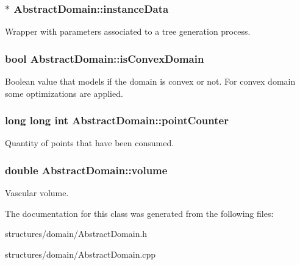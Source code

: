 \subsubsection[{\texorpdfstring{instance\+Data}{instanceData}}]{$\ast$ Abstract\+Domain\+::instance\+Data\hspace{0.3cm}{\ttfamily [protected]}}\hypertarget{class_abstract_domain_aa37fbabc2bfa92c574f7db7544016b53}{}\label{class_abstract_domain_aa37fbabc2bfa92c574f7db7544016b53}
Wrapper with parameters associated to a tree generation process. 
\subsubsection[{\texorpdfstring{is\+Convex\+Domain}{isConvexDomain}}]{\setlength{\rightskip}{0pt plus 5cm}bool Abstract\+Domain\+::is\+Convex\+Domain\hspace{0.3cm}{\ttfamily [protected]}}\hypertarget{class_abstract_domain_acaa76f4d7e102e66b64d10cd652167c9}{}\label{class_abstract_domain_acaa76f4d7e102e66b64d10cd652167c9}
Boolean value that models if the domain is convex or not. For convex domain some optimizations are applied. 
\subsubsection[{\texorpdfstring{point\+Counter}{pointCounter}}]{\setlength{\rightskip}{0pt plus 5cm}long long int Abstract\+Domain\+::point\+Counter\hspace{0.3cm}{\ttfamily [protected]}}\hypertarget{class_abstract_domain_af6ca325d56ec51a792d2c0c049e424b0}{}\label{class_abstract_domain_af6ca325d56ec51a792d2c0c049e424b0}
Quantity of points that have been consumed. 
\subsubsection[{\texorpdfstring{volume}{volume}}]{\setlength{\rightskip}{0pt plus 5cm}double Abstract\+Domain\+::volume\hspace{0.3cm}{\ttfamily [protected]}}\hypertarget{class_abstract_domain_a1cd2c4a6df09d717a7c77c82066f8060}{}\label{class_abstract_domain_a1cd2c4a6df09d717a7c77c82066f8060}
Vascular volume. 

The documentation for this class was generated from the following files\+:\begin{DoxyCompactItemize}
\item 
structures/domain/Abstract\+Domain.\+h\item 
structures/domain/Abstract\+Domain.\+cpp\end{DoxyCompactItemize}
